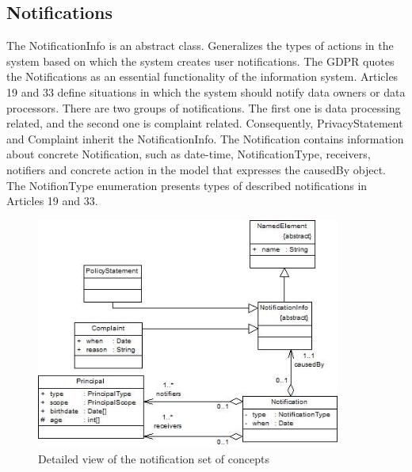 \documentclass[11pt,english]{article}
\begin{document}
\subsection{Notifications}
The NotificationInfo is an abstract class. Generalizes the types of actions in the system based on which the system creates user notifications. The GDPR quotes the Notifications as an essential functionality of the information system. Articles 19 and 33 define situations in which the system should notify data owners or data processors. There are two groups of notifications. The first one is data processing related, and the second one is complaint related. Consequently, PrivacyStatement and Complaint inherit the NotificationInfo. The Notification contains information about concrete Notification, such as date-time, NotificationType, receivers, notifiers and concrete action in the model that expresses the causedBy object. The NotifionType enumeration presents types of described notifications in Articles 19 and 33.
\begin{figure}[H]
    \centering
    \includegraphics[width=10cm,scale=0.5]{images/notification.jpg}
    \caption{Detailed view of the notification set of concepts}
    \label{fig:Notifications}
\end{figure}
\end{document}
